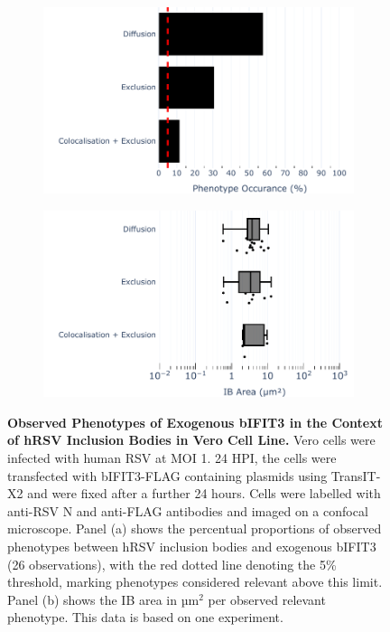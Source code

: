 \begin{figure}
    \begin{subfigure}{0.495\textwidth}
        \caption{}
        \includegraphics[width=1\linewidth]{09. Chapter 4/Figs/02. Overexpression/03. IFIT3/01. bar_i3_hrsv.pdf} 
    \end{subfigure}
    \begin{subfigure}{0.495\textwidth}
        \caption{}
        \includegraphics[width=1\linewidth]{09. Chapter 4/Figs/02. Overexpression/03. IFIT3/02. box_i3_hrsv.pdf}
    \end{subfigure}
    \caption[Observed Phenotypes of Exogenous bIFIT3 in the Context of hRSV Inclusion Bodies in Vero Cell Line.]{\textbf{Observed Phenotypes of Exogenous bIFIT3 in the Context of hRSV Inclusion Bodies in Vero Cell Line.} Vero cells were infected with human RSV at MOI 1. 24 HPI, the cells were transfected with bIFIT3-FLAG containing plasmids using TransIT-X2 and were fixed after a further 24 hours. Cells were labelled with anti-RSV N and anti-FLAG antibodies and imaged on a confocal microscope. Panel (a) shows the percentual proportions of observed phenotypes between hRSV inclusion bodies and exogenous bIFIT3 (26 observations), with the red dotted line denoting the 5\% threshold, marking phenotypes considered relevant above this limit. Panel (b) shows the IB area in \(\mbox{µm}^2\) per observed relevant phenotype. This data is based on one experiment.}
    \label{fig:Observed Phenotypes of Exogenous bIFIT3 in the Context of hRSV Inclusion Bodies in VERO Cell Line}
\end{figure}

